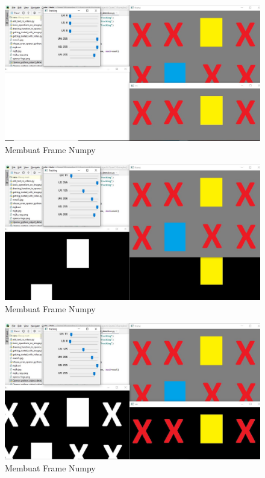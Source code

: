 \begin{figure}[ht]
\centering
\includegraphics[scale=0.5]{figures/2,36.jpg}
\caption{Membuat Frame Numpy}
\label{contoh}
\end{figure}

\begin{figure}[ht]
\centering
\includegraphics[scale=0.5]{figures/2,36,1.jpg}
\caption{Membuat Frame Numpy}
\label{contoh}
\end{figure}

\begin{figure}[ht]
\centering
\includegraphics[scale=0.5]{figures/2,36,2.jpg}
\caption{Membuat Frame Numpy}
\label{contoh}
\end{figure}

